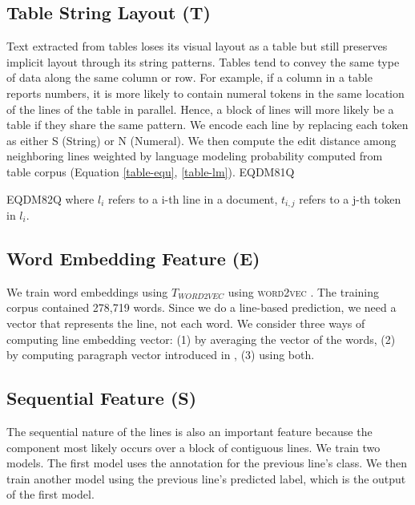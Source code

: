 \documentclass[11pt,letterpaper]{article}
\begin{document}
\subsection{Table String Layout (T)} Text extracted from tables loses its visual layout as a table but still preserves implicit layout through its string patterns. Tables tend to convey the same type of data along the same column or row. For example, if a column in a table reports numbers, it is more likely to contain numeral tokens in the same location of the lines of the table in parallel. Hence, a block of lines will more likely be a table if they share the same pattern. We encode each line by replacing each token as either S (String) or N (Numeral). We then compute the edit distance among neighboring lines weighted by language modeling probability computed from table corpus (Equation \ref{table-equ}, \ref{table-lm}). 
EQDM81Q
\vspace{-4em}

EQDM82Q
  where $l_i$ refers to a i-th line in a document, $t_{i,j}$ refers to a j-th token in $l_i$.

\subsection{Word Embedding Feature (E)} We train word embeddings using $T_{WORD2VEC}$ using \textsc{word2vec} \cite{embedding}. The training corpus contained 278,719 words. Since we do a line-based prediction, we need a vector that represents the line, not each word. We consider three ways of computing line embedding vector: (1) by averaging the vector of the words, (2) by computing paragraph vector introduced in \cite{le}, (3) using both.

\subsection{Sequential Feature (S)}  The sequential nature of the lines is also an important feature because the component most likely occurs over a block of contiguous lines. We train two models. The first model uses the annotation for the previous line's class. We then train another model using the previous line's predicted label, which is the output of the first model.

\setlength{\tabcolsep}{4pt}
\end{document}
